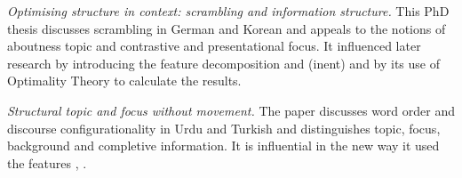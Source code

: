 \documentclass[output=paper,hidelinks]{langscibook}
\begin{document}
\vspace{+6pt}
\citet{Choi1996} \textit{Optimising structure in context: scrambling and information structure.} This PhD thesis discusses scrambling in German and Korean and appeals to the notions of 
aboutness topic and contrastive and presentational focus. It influenced later research by introducing the feature decomposition \textsc{} and \textsc{}(inent) and by its use of Optimality Theory to calculate the results. 

\vspace{+6pt} 
\citet{BK96} \textit{Structural topic and focus without movement.} The paper discusses word order and discourse configurationality in Urdu and Turkish and distinguishes topic, focus, background and completive information. It is influential in the new way it used the features \textsc{}, \textsc{}. 

 
\end{document}
